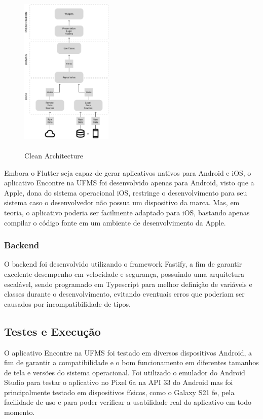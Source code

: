     \begin{figure}[h]
        \centering
        \includegraphics[width=44mm,height=80mm]{imagens/cleanarch.png}
        \caption{\scriptsize Clean Architecture}
        \footnotesize  {}
        \label{fig:clean-architecture}
    \end{figure}

    \FloatBarrier

    Embora o Flutter seja capaz de gerar aplicativos nativos para Android e iOS, o aplicativo Encontre na UFMS foi desenvolvido apenas para Android, visto que a Apple, dona do sistema operacional iOS, restringe o desenvolvimento para seu sistema caso o desenvolvedor não possua um dispositivo da marca. Mas, em teoria, o aplicativo poderia ser facilmente adaptado para iOS, bastando apenas compilar o código fonte em um ambiente de desenvolvimento da Apple.

\subsubsection{Backend}

    O backend foi desenvolvido utilizando o framework Fastify, a fim de garantir excelente desempenho em velocidade e segurança, possuindo uma arquitetura escalável, sendo programado em Typescript para melhor definição de variáveis e classes durante o desenvolvimento, evitando eventuais erros que poderiam ser causados por incompatibilidade de tipos.

\subsection{Testes e Execução}

    O aplicativo Encontre na UFMS foi testado em diversos dispositivos Android, a fim de garantir a compatibilidade e o bom funcionamento em diferentes tamanhos de tela e versões do sistema operacional. Foi utilizado o emulador do Android Studio para testar o aplicativo no Pixel 6a na API 33 do Android mas foi principalmente testado em dispositivos físicos, como o Galaxy S21 fe, pela facilidade de uso e para poder verificar a usabilidade real do aplicativo em todo momento.

